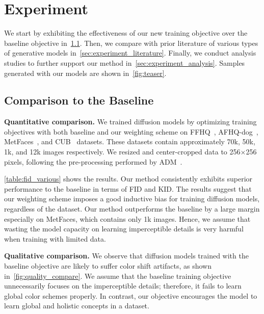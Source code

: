 \section{Experiment}
\label{sec:experiment}
We start by exhibiting the effectiveness of our new training objective over the baseline objective in~\cref{sec:experiment_baseline}. Then, we compare with prior literature of various types of generative models in~\cref{sec:experiment_literature}. Finally, we conduct analysis studies to further support our method in~\cref{sec:experiment_analysis}. Samples generated with our models are shown in~\cref{fig:teaser}.




\subsection{Comparison to the Baseline}
\label{sec:experiment_baseline}
\textbf{Quantitative comparison.  } 
We trained diffusion models by optimizing training objectives with both baseline and our weighting scheme on FFHQ~\cite{stylegan}, AFHQ-dog~\cite{choi2020stargan}, MetFaces~\cite{karras2020training}, and CUB~\cite{wah2011caltech} datasets. These datasets contain approximately 70k, 50k, 1k, and 12k images respectively.  We resized and center-cropped data to 256$\times$256 pixels, following the pre-processing performed by ADM~\cite{dhariwal2021diffusion}.

\cref{table:fid_various} shows the results. Our method consistently exhibits superior performance to the baseline in terms of FID and KID. The results suggest that our weighting scheme imposes a good inductive bias for training diffusion models, regardless of the dataset. Our method outperforms the baseline by a large margin especially on MetFaces, which contains only 1k images. Hence, we assume that wasting the model capacity on learning imperceptible details is very harmful when training with limited data. 


\textbf{Qualitative comparison.  }
We observe that diffusion models trained with the baseline objective are likely to suffer color shift artifacts, as shown in~\cref{fig:quality_compare}. We assume that the baseline training objective unnecessarily focuses on the imperceptible details; therefore, it fails to learn global color schemes properly. In contrast, our objective encourages the model to learn global and holistic concepts in a dataset.

